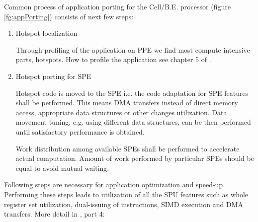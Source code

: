 Common process of application porting for the \mbox{Cell/B.E.} processor (figure \ref{fg:appPorting}) consists of next few steps:
\begin{enumerate}
\item Hotspot localization
\par
Through profiling of the application on PPE we find most compute intensive parts, hotspots.
How to profile the application see chapter 5 of \cite{programmersGuide}.

\item Hotspot porting for SPE
\par
Hotspot code is moved to the SPE i.e. the code adaptation for SPE features shall be performed.
This means DMA transfers instead of direct memory access, appropriate data structures or other changes utilization.
Data movement tuning, e.g. using different data structures, can be then performed until satisfactory performance is obtained.

\par
Work distribution among available SPEs shall be performed to accelerate actual computation.
Amount of work performed by particular SPEs should be equal to avoid mutual waiting.
\end{enumerate}

\par
Following steps are necessary for application optimization and speed-up.
Performing these steps leads to utilization of all the SPU features such as whole register set utilization, dual-issuing of instructions, SIMD execution and DMA transfers.
More detail in \cite{writingPerfApps}, part 4:


